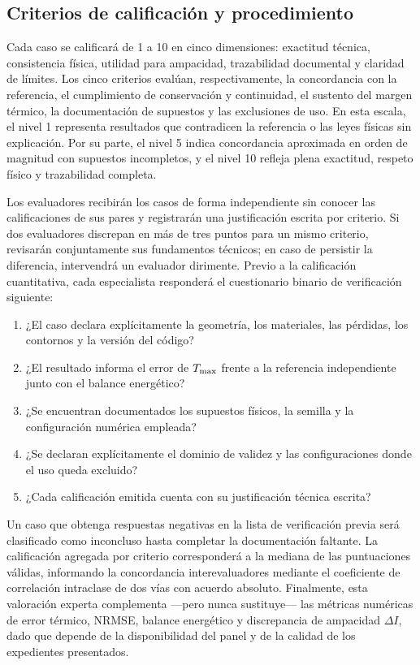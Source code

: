 \subsection*{Criterios de calificación y procedimiento}

Cada caso se calificará de 1 a 10 en cinco dimensiones: exactitud técnica, consistencia física, utilidad para ampacidad, trazabilidad documental y claridad de límites. Los cinco criterios evalúan, respectivamente, la concordancia con la referencia, el cumplimiento de conservación y continuidad, el sustento del margen térmico, la documentación de supuestos y las exclusiones de uso. En esta escala, el nivel 1 representa resultados que contradicen la referencia o las leyes físicas sin explicación. Por su parte, el nivel 5 indica concordancia aproximada en orden de magnitud con supuestos incompletos, y el nivel 10 refleja plena exactitud, respeto físico y trazabilidad completa.

Los evaluadores recibirán los casos de forma independiente sin conocer las calificaciones de sus pares y registrarán una justificación escrita por criterio. Si dos evaluadores discrepan en más de tres puntos para un mismo criterio, revisarán conjuntamente sus fundamentos técnicos; en caso de persistir la diferencia, intervendrá un evaluador dirimente. Previo a la calificación cuantitativa, cada especialista responderá el cuestionario binario de verificación siguiente:

\begin{enumerate}
  \item ¿El caso declara explícitamente la geometría, los materiales, las pérdidas, los contornos y la versión del código?
  \item ¿El resultado informa el error de $T_{\max}$ frente a la referencia independiente junto con el balance energético?
  \item ¿Se encuentran documentados los supuestos físicos, la semilla y la configuración numérica empleada?
  \item ¿Se declaran explícitamente el dominio de validez y las configuraciones donde el uso queda excluido?
  \item ¿Cada calificación emitida cuenta con su justificación técnica escrita?
\end{enumerate}

Un caso que obtenga respuestas negativas en la lista de verificación previa será clasificado como inconcluso hasta completar la documentación faltante. La calificación agregada por criterio corresponderá a la mediana de las puntuaciones válidas, informando la concordancia interevaluadores mediante el coeficiente de correlación intraclase de dos vías con acuerdo absoluto. Finalmente, esta valoración experta complementa —pero nunca sustituye— las métricas numéricas de error térmico, NRMSE, balance energético y discrepancia de ampacidad $\Delta I$, dado que depende de la disponibilidad del panel y de la calidad de los expedientes presentados.

